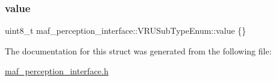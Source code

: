 \subsubsection{\texorpdfstring{value}{value}}
{\footnotesize\ttfamily uint8\+\_\+t maf\+\_\+perception\+\_\+interface\+::\+V\+R\+U\+Sub\+Type\+Enum\+::value \{\}}



The documentation for this struct was generated from the following file\+:\begin{DoxyCompactItemize}
\item 
\hyperlink{maf__perception__interface_8h}{maf\+\_\+perception\+\_\+interface.\+h}\end{DoxyCompactItemize}
